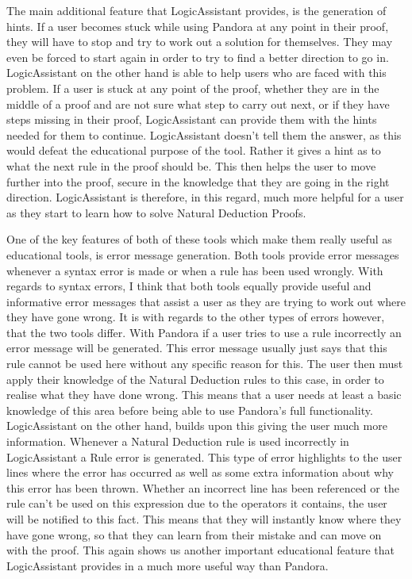 The main additional feature that LogicAssistant provides, is the generation of hints. If a user becomes stuck while using Pandora at any point in their proof, they will have to stop and try to work out a solution for themselves. They may even be forced to start again in order to try to find a better direction to go in. LogicAssistant on the other hand is able to help users who are faced with this problem. If a user is stuck at any point of the proof, whether they are in the middle of a proof and are not sure what step to carry out next, or if they have steps missing in their proof, LogicAssistant can provide them with the hints needed for them to continue. LogicAssistant doesn't tell them the answer, as this would defeat the educational purpose of the tool. Rather it gives a hint as to what the next rule in the proof should be. This then helps the user to move further into the proof, secure in the knowledge that they are going in the right direction. LogicAssistant is therefore, in this regard, much more helpful for a user as they start to learn how to solve Natural Deduction Proofs.

One of the key features of both of these tools which make them really useful as educational tools, is error message generation. Both tools provide error messages whenever a syntax error is made or when a rule has been used wrongly. With regards to syntax errors, I think that both tools equally provide useful and informative error messages that assist a user as they are trying to work out where they have gone wrong. It is with regards to the other types of errors however, that the two tools differ. With Pandora if a user tries to use a rule incorrectly an error message will be generated. This error message usually just says that this rule cannot be used here without any specific reason for this. The user then must apply their knowledge of the Natural Deduction rules to this case, in order to realise what they have done wrong. This means that a user needs at least a basic knowledge of this area before being able to use Pandora's full functionality. LogicAssistant on the other hand, builds upon this giving the user much more information. Whenever a Natural Deduction rule is used incorrectly in LogicAssistant a Rule error is generated. This type of error highlights to the user lines where the error has occurred as well as some extra information about why this error has been thrown. Whether an incorrect line has been referenced or the rule can't be used on this expression due to the operators it contains, the user will be notified to this fact. This means that they will instantly know where they have gone wrong, so that they can learn from their mistake and can move on with the proof. This again shows us another important educational feature that LogicAssistant provides in a much more useful way than Pandora.

